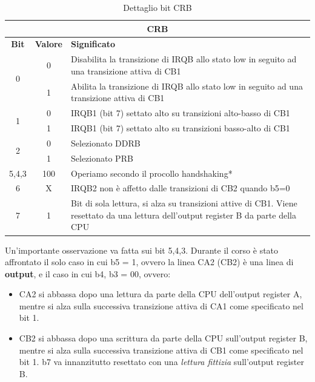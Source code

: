 \begin{table}[H]
\centering
\begin{tabular}{|c|c|p{9cm}|}
    \hline
    \multicolumn{3}{|c|}{\textbf{CRB}} \\
    \hline
    \textbf{Bit} & \textbf{Valore} & \textbf{Significato} \\
    \hline
    \multirow{2}{*}{0} & 0 & Disabilita la transizione di IRQB allo stato low in seguito ad una transizione attiva di CB1 \\
                    & 1 &  Abilita la transizione di IRQB allo stato low in seguito ad una transizione attiva di CB1 \\
    \hline
    \multirow{2}{*}{1} & 0 & IRQB1 (bit 7) settato alto su transizioni alto-basso di CB1 \\
    & 1 & IRQB1 (bit 7) settato alto su transizioni basso-alto di CB1 \\
    \hline
    \multirow{2}{*}{2} & 0 & Selezionato DDRB \\
    & 1 & Selezionato PRB \\
    \hline
    5,4,3 & 100 & Operiamo secondo il procollo handshaking* \\
    
    \hline
    6 & X & IRQB2 non è affetto dalle transizioni di CB2 quando b5=0\\
    \hline
    7 & 1 & Bit di sola lettura, si alza su transizioni attive di CB1. Viene resettato da una lettura dell'output register B da parte della CPU \\
    \hline
\end{tabular}
\caption{Dettaglio bit CRB}
\label{Tab:CRB}
\end{table}

Un'importante osservazione va fatta sui bit 5,4,3. Durante il corso è stato affrontato il solo caso in cui b5 = 1, ovvero la linea CA2 (CB2) è una linea di \textbf{output}, e il caso in cui b4, b3 = 00, ovvero:
\begin{itemize}
    \item CA2 si abbassa dopo una lettura da parte della CPU dell'output register A, mentre si alza sulla successiva transizione attiva di CA1 come specificato nel bit 1.
    \item CB2 si abbassa dopo una scrittura da parte della CPU sull'output register B, mentre si alza sulla successiva transizione attiva di CB1 come specificato nel bit 1. b7 va innanzitutto resettato con una \textit{lettura fittizia} sull'output register B.
\end{itemize}


